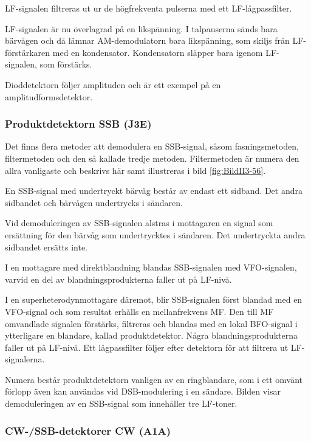 LF-signalen filtreras ut ur de högfrekventa pulserna med ett LF-lågpassfilter.

LF-signalen är nu överlagrad på en likspänning.
I talpauserna sänds bara bärvågen och då lämnar AM-demodulatorn bara
likspänning, som skiljs från LF-förstärkaren med en kondensator.
Kondensatorn släpper bara igenom LF-signalen, som förstärks.

Dioddetektorn följer amplituden och är ett exempel på en amplitudformsdetektor.

\subsubsection{Produktdetektorn SSB (J3E)}


Det finns flera metoder att demodulera en SSB-signal, såsom fasningsmetoden,
filtermetoden och den så kallade tredje metoden.
Filtermetoden är numera den allra vanligaste och beskrivs här samt
illustreras i bild \ref{fig:BildII3-56}.

En SSB-signal med undertryckt bärvåg består av endast ett sidband.
Det andra sidbandet och bärvågen undertrycks i sändaren.

Vid demoduleringen av SSB-signalen alstras i mottagaren en signal som
ersättning för den bärvåg som undertrycktes i sändaren.
Det undertryckta andra sidbandet ersätts inte.

I en mottagare med direktblandning blandas SSB-signalen med VFO-signalen,
varvid en del av blandningsprodukterna faller ut på LF-nivå.

I en superheterodynmottagare däremot, blir SSB-signalen först blandad
med en VFO-signal och som resultat erhålls en mellanfrekvens MF.
Den till MF omvandlade signalen förstärks, filtreras och blandas med en
lokal BFO-signal i ytterligare en blandare, kallad produktdetektor.
Några blandningsprodukterna faller ut på LF-nivå.
Ett lågpassfilter följer efter detektorn för att filtrera ut LF-signalerna.

Numera består produktdetektorn vanligen av en ringblandare, som i ett omvänt
förlopp även kan användas vid DSB-modulering i en sändare.
Bilden visar demoduleringen av en SSB-signal som innehåller tre LF-toner.

\subsubsection{CW-/SSB-detektorer CW (A1A)}

